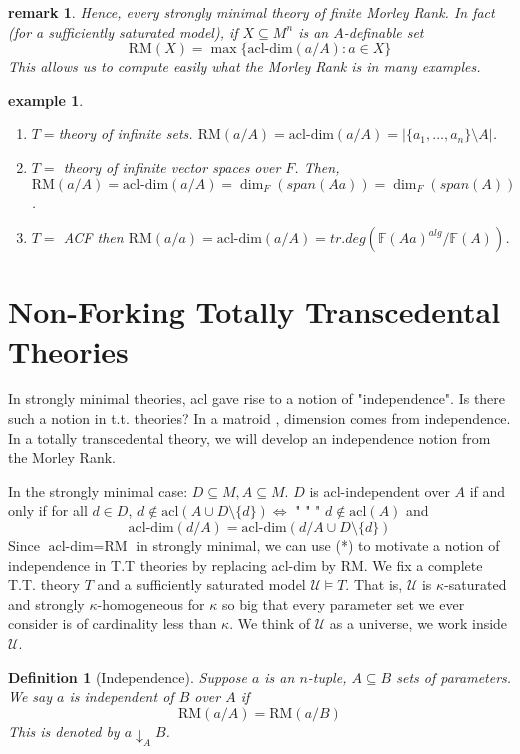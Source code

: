 \documentclass[letterpaper, 12pt]{article}
\newcommand{\fin}{\qquad \quad \hfill \framebox[1.75mm][l]{\,}}
\newcommand{\cU}{\mathcal{U}}
\newcommand{\bF}{\mathbb{F}}
\newcommand{\RM}{\mbox{RM}}
\newcommand{\acl}{\mbox{acl}}
\newcommand{\acldim}{\mbox{acl-dim}}
\theoremstyle{stdthm}
\theoremstyle{stddef}
\newtheorem{defn}[thm]{Definition}
\newtheorem{rem}[thm]{remark} %
\newtheorem{eg}[thm]{example} %
\theoremstyle{stdnonum}
\theoremstyle{stdqands}
\theoremstyle{stdbold}
\begin{document}
\begin{rem}
Hence, every strongly minimal theory of finite Morley Rank. In fact (for a sufficiently saturated model), if $X \subseteq M^n$ is an $A$-definable set 
\[ \RM(X) = \max\{\acldim(a/A): a \in X\} \]
This allows us to compute easily what the Morley Rank is in many examples.  
\end{rem}

\begin{eg}
\begin{enumerate}
\item $T = $theory of infinite sets. $\RM(a/A) = \acldim(a/A) = |\{a_1,\dots,a_n\}\setminus A|$. 
\item $T = $ theory of infinite vector spaces over $F$. Then, $\RM(a/A) = \acldim(a/A) = \dim_F(span(Aa)) = \dim_F(span(A))$. 
\item $T = $ ACF then $\RM(a/a) = \acldim(a/A) = tr.deg(\bF(Aa)^{alg}/\bF(A))$. 
\end{enumerate}

\end{eg}

\newpage

\section{Non-Forking Totally Transcedental Theories}
In strongly minimal theories, acl gave rise to a notion of "independence". Is there such a notion in t.t. theories? In a matroid , dimension comes from independence. In a totally transcedental theory, we will develop an independence notion from the Morley Rank. 

In the strongly minimal case: $D \subseteq M, A \subseteq M$. $D$ is acl-independent over $A$ if and only if for all $d \in D$, $d \notin \acl(A \cup D \setminus \{d\}) \iff$ " " " $d \notin \acl(A)$ and 
\[\tag{*} \acldim(d/A) = \acldim(d/A\cup D\setminus\{d\})\] 
Since $\acldim = \RM$ in strongly minimal, we can use (*) to motivate a notion of independence in T.T theories by replacing acl-dim by $\RM$. We fix a complete T.T. theory $T$ and a sufficiently saturated model $\cU \models T$.  That is, $\cU$ is $\kappa$-saturated and strongly $\kappa$-homogeneous for $\kappa$ so big that every parameter set we ever consider is of cardinality less than $\kappa$. We think of $\cU$ as a universe, we work inside $\cU$. 

\begin{defn}[Independence]
Suppose $a$ is an $n$-tuple, $A \subseteq B$ sets of parameters. We say $a$ is independent of $B$ over $A$ if 
\[ \RM(a/A) = \RM(a/B) \]
This is denoted by $a \downarrow_A B$. 
\end{defn}
\end{document}
